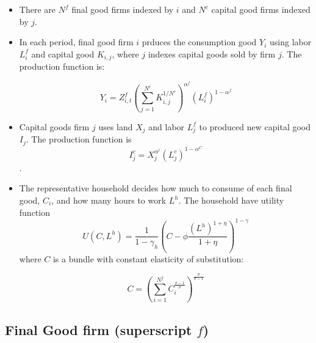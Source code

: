 \documentclass[11pt]{article}
\numberwithin{equation}{section}
\begin{document}
\begin{itemize}
	\item There are $N^f$ final good firms indexed by $i$ and $N^c$ capital good firms indexed by $j$. \medskip
	
	\item In each period, final good firm $i$ prduces the consumption good $Y_i$ using labor $L^f_{i}$ and capital good $K_{i,j}$,  where $j$ indexes capital goods sold by firm $j$. The production function is:
	
	 $$Y_i = Z^f_{i,t} \left( \sum_{j=1}^{N^c } K^{1/N^c}_{i,j}\right)^{\alpha^f} \left(L_i^f\right)^{1-\alpha^f}$$
	
	\item Capital goods firm $j$ uses land $X_j$ and labor $L^f_j$ to produced new capital good $I_j$. The production function is $$I^c_j = X_j^{\alpha^c} \left(L_j^c\right)^{1-\alpha^C}$$.  
	
	\item The representative household decides how much to consume of each final good,  $C_i$, and how many hours to work $L^h$. The household have utility function $$U(C, L^h) = \frac{1}{1-\gamma_h} \left(C- \phi \frac{\left( L^h \right)^{1+\eta}}{1+\eta} \right)^{1-\gamma} $$ where $C$ is a bundle with constant elasticity of substitution:
	
	$$C = \left( \sum_{i=1}^{N^f} C^{\frac{\sigma-1}{\sigma}}_i \right)^{\frac{\sigma}{\sigma-1}}$$
	
\end{itemize}

\subsection{Final Good firm (superscript $f$)}
\end{document}
